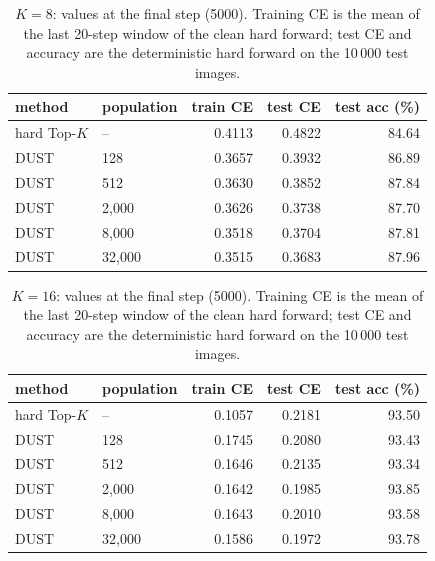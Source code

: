 \begin{table}[H]
\centering
\caption{$K = 8$: values at the final step (5000). Training CE is the mean of the last 20-step window of the clean hard forward; test CE and accuracy are the deterministic hard forward on the 10\,000 test images.}
\label{tab:k8}
\begin{tabular}{llrrr}
\toprule
    method & population & train CE & test CE & test acc (\%) \\
\midrule
    hard Top-$K$ & -- & 0.4113 & 0.4822 & 84.64 \\
    DUST & 128 & 0.3657 & 0.3932 & 86.89 \\
    DUST & 512 & 0.3630 & 0.3852 & 87.84 \\
    DUST & 2,000 & 0.3626 & 0.3738 & 87.70 \\
    DUST & 8,000 & 0.3518 & 0.3704 & 87.81 \\
    DUST & 32,000 & 0.3515 & 0.3683 & 87.96 \\
\bottomrule
\end{tabular}
\end{table}

\begin{table}[H]
\centering
\caption{$K = 16$: values at the final step (5000). Training CE is the mean of the last 20-step window of the clean hard forward; test CE and accuracy are the deterministic hard forward on the 10\,000 test images.}
\label{tab:k16}
\begin{tabular}{llrrr}
\toprule
    method & population & train CE & test CE & test acc (\%) \\
\midrule
    hard Top-$K$ & -- & 0.1057 & 0.2181 & 93.50 \\
    DUST & 128 & 0.1745 & 0.2080 & 93.43 \\
    DUST & 512 & 0.1646 & 0.2135 & 93.34 \\
    DUST & 2,000 & 0.1642 & 0.1985 & 93.85 \\
    DUST & 8,000 & 0.1643 & 0.2010 & 93.58 \\
    DUST & 32,000 & 0.1586 & 0.1972 & 93.78 \\
\bottomrule
\end{tabular}
\end{table}

